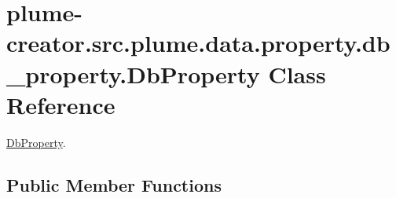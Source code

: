 \hypertarget{classplume-creator_1_1src_1_1plume_1_1data_1_1property_1_1db__property_1_1_db_property}{}\section{plume-\/creator.src.\+plume.\+data.\+property.\+db\+\_\+property.\+Db\+Property Class Reference}
\label{classplume-creator_1_1src_1_1plume_1_1data_1_1property_1_1db__property_1_1_db_property}


\hyperlink{classplume-creator_1_1src_1_1plume_1_1data_1_1property_1_1db__property_1_1_db_property}{Db\+Property}.  


\subsection*{Public Member Functions}

